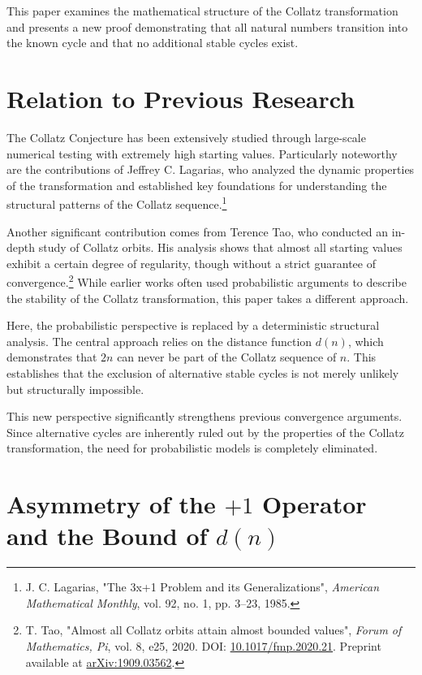 \documentclass[a4paper,12pt]{article}
\begin{document}
This paper examines the mathematical structure of the Collatz transformation and presents a new proof demonstrating that all natural numbers transition into the known cycle and that no additional stable cycles exist.

\section{Relation to Previous Research}
The Collatz Conjecture has been extensively studied through large-scale numerical testing with extremely high starting values. Particularly noteworthy are the contributions of Jeffrey C. Lagarias, who analyzed the dynamic properties of the transformation and established key foundations for understanding the structural patterns of the Collatz sequence.\footnote{J. C. Lagarias, "The 3x+1 Problem and its Generalizations", \textit{American Mathematical Monthly}, vol. 92, no. 1, pp. 3–23, 1985.} 

Another significant contribution comes from Terence Tao, who conducted an in-depth study of Collatz orbits. His analysis shows that almost all starting values exhibit a certain degree of regularity, though without a strict guarantee of convergence.\footnote{T. Tao, "Almost all Collatz orbits attain almost bounded values", \textit{Forum of Mathematics, Pi}, vol. 8, e25, 2020. DOI: \href{https://doi.org/10.1017/fmp.2020.21}{10.1017/fmp.2020.21}. Preprint available at \href{https://arxiv.org/abs/1909.03562}{arXiv:1909.03562}.} While earlier works often used probabilistic arguments to describe the stability of the Collatz transformation, this paper takes a different approach.

Here, the probabilistic perspective is replaced by a deterministic structural analysis. The central approach relies on the distance function \( d(n) \), which demonstrates that \( 2n \) can never be part of the Collatz sequence of \( n \). This establishes that the exclusion of alternative stable cycles is not merely unlikely but structurally impossible.

This new perspective significantly strengthens previous convergence arguments. Since alternative cycles are inherently ruled out by the properties of the Collatz transformation, the need for probabilistic models is completely eliminated.






\section{Asymmetry of the \( +1 \) Operator and the Bound of \( d(n) \)}
\end{document}
